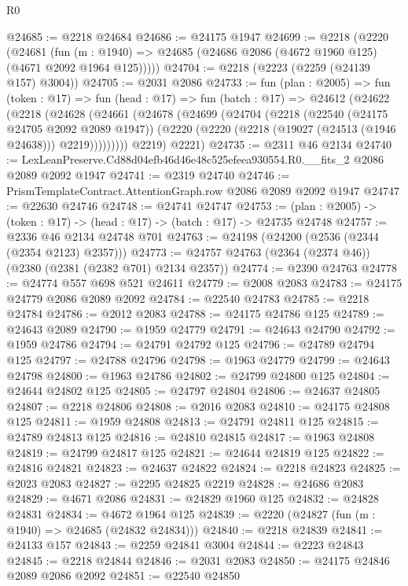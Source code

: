 \begin{lexlean}{R0}
\begin{coremodule}
@24685 := @2218 @24684
@24686 := @24175 @1947
@24699 := @2218
    (@2220
      (@24681
        (fun (m : @1940) => @24685 (@24686 @2086 (@4672 @1960 @125) (@4671 @2092 @1964 @125)))))
@24704 := @2218 (@2223 (@2259 (@24139 @157) @3004))
@24705 := @2031 @2086
@24733 := fun (plan : @2005) =>
  fun (token : @17) =>
  fun (head : @17) =>
  fun (batch : @17) =>
  @24612
    (@24622
      (@2218
        (@24628
          (@24661
            (@24678
              (@24699
                (@24704
                  (@2218
                    (@22540 (@24175 @24705 @2092 @2089 @1947))
                    (@2220 (@2220 (@2218 (@19027 (@24513 (@1946 @24638))) @2219)))))))))
        @2219)
      @2221)
@24735 := @2311 @46 @2134
@24740 := LexLeanPreserve.Cd88d04efb46d46e48c525efeea930554.R0.__fits_2 @2086 @2089 @2092 @1947
@24741 := @2319 @24740
@24746 := PrismTemplateContract.AttentionGraph.row @2086 @2089 @2092 @1947
@24747 := @22630 @24746
@24748 := @24741 @24747
@24753 := (plan : @2005) -> (token : @17) -> (head : @17) -> (batch : @17) -> @24735 @24748
@24757 := @2336 @46 @2134 @24748 @701
@24763 := @24198 (@24200 (@2536 (@2344 (@2354 @2123) @2357)))
@24773 := @24757 @24763 (@2364 (@2374 @46)) (@2380 (@2381 (@2382 @701) @2134 @2357))
@24774 := @2390 @24763
@24778 := @24774 @557 @698 @521 @24611
@24779 := @2008 @2083
@24783 := @24175 @24779 @2086 @2089 @2092
@24784 := @22540 @24783
@24785 := @2218 @24784
@24786 := @2012 @2083
@24788 := @24175 @24786 @125
@24789 := @24643 @2089
@24790 := @1959 @24779
@24791 := @24643 @24790
@24792 := @1959 @24786
@24794 := @24791 @24792 @125
@24796 := @24789 @24794 @125
@24797 := @24788 @24796
@24798 := @1963 @24779
@24799 := @24643 @24798
@24800 := @1963 @24786
@24802 := @24799 @24800 @125
@24804 := @24644 @24802 @125
@24805 := @24797 @24804
@24806 := @24637 @24805
@24807 := @2218 @24806
@24808 := @2016 @2083
@24810 := @24175 @24808 @125
@24811 := @1959 @24808
@24813 := @24791 @24811 @125
@24815 := @24789 @24813 @125
@24816 := @24810 @24815
@24817 := @1963 @24808
@24819 := @24799 @24817 @125
@24821 := @24644 @24819 @125
@24822 := @24816 @24821
@24823 := @24637 @24822
@24824 := @2218 @24823
@24825 := @2023 @2083
@24827 := @2295 @24825 @2219
@24828 := @24686 @2083
@24829 := @4671 @2086
@24831 := @24829 @1960 @125
@24832 := @24828 @24831
@24834 := @4672 @1964 @125
@24839 := @2220 (@24827 (fun (m : @1940) => @24685 (@24832 @24834)))
@24840 := @2218 @24839
@24841 := @24133 @157
@24843 := @2259 @24841 @3004
@24844 := @2223 @24843
@24845 := @2218 @24844
@24846 := @2031 @2083
@24850 := @24175 @24846 @2089 @2086 @2092
@24851 := @22540 @24850

\end{coremodule}
\end{lexlean}
